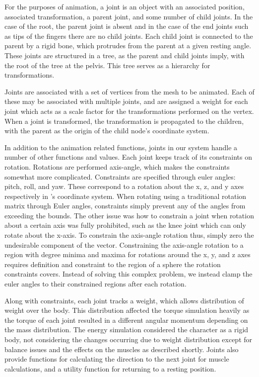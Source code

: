 For the purposes of animation, a joint is an object with an associated position, associated transformation, a parent joint, and some number of child joints.  In the case of the root, the parent joint is absent and in the case of the end joints such as tips of the fingers there are no child joints.  Each child joint is connected to the parent by a rigid bone, which protrudes from the parent at a given resting angle.  These joints are structured in a tree, as the parent and child joints imply, with the root of the tree at the pelvis.  This tree serves as a hierarchy for transformations.

Joints are associated with a set of vertices from the mesh to be animated.  Each of these may be associated with multiple joints, and are assigned a weight for each joint which acts as a scale factor for the transformations performed on the vertex.  When a joint is transformed, the transformation is propagated to the children, with the parent as the origin of the child node's coordinate system.

In addition to the animation related functions, joints in our system handle a number of other functions and values.  Each joint keeps track of its constraints on rotation.  Rotations are performed axis-angle, which makes the constraints somewhat more complicated.  Constraints are specified through euler angles: pitch, roll, and yaw.  These correspond to a rotation about the x, z, and y axes respectively in \unity's coordinate system.  When rotating using a traditional rotation matrix through Euler angles, constraints simply prevent any of the angles from exceeding the bounds.  The other issue was how to constrain a joint when rotation about a certain axis was fully prohibited, such as the knee joint which can only rotate about the x-axis.  To constrain the axis-angle rotation thus, simply zero the undesirable component of the vector.  Constraining the axis-angle rotation to a region with degree minima and maxima for rotations around the x, y, and z axes requires definition and constraint to the region of a sphere the rotation constraints covers.  Instead of solving this complex problem, we instead clamp the euler angles to their constrained regions after each rotation.

Along with constraints, each joint tracks a weight, which allows distribution of weight over the body.  This distribution affected the torque simulation heavily as the torque of each joint resulted in a different angular momentum depending on the mass distribution.  The energy simulation considered the character as a rigid body, not considering the changes occurring due to weight distribution except for balance issues and the effects on the muscles as described shortly.  Joints also provide functions for calculating the direction to the next joint for muscle calculations, and a utility function for returning to a resting position.

